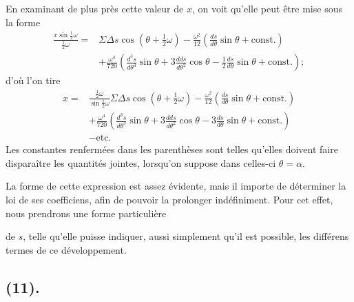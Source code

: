 \documentclass{article}
\begin{document}
En examinant de plus près cette valeur de $x$, on voit qu'elle peut être mise sous la forme
\[ \begin{aligned} \frac{x\sin\frac{1}{2}\omega}{\frac{1}{2}\omega}={}&\Sigma\Delta s\cos(\theta+\tfrac{1}{2}\omega)-\frac{\omega^{2}}{12}\left(\frac{ds}{d\theta}\sin\theta+\text{const.}\right)\\ &+\frac{\omega^{4}}{720}\left(\frac{d^{3}s}{d\theta^{3}}\sin\theta+3\frac{dds}{d\theta^{2}}\cos\theta-\frac{1}{2}\frac{ds}{d\theta}\sin\theta+\text{const.}\right); \end{aligned} \]
d'où l'on tire
\[ \begin{aligned} x={}&\frac{\frac{1}{2}\omega}{\sin\frac{1}{2}\omega}\Sigma\Delta s\cos(\theta+\tfrac{1}{2}\omega)-\frac{\omega^{2}}{12}\left(\frac{ds}{d\theta}\sin\theta+\text{const.}\right)\\ &+\frac{\omega^{4}}{720}\left(\frac{d^{3}s}{d\theta^{3}}\sin\theta+3\frac{dds}{d\theta^{2}}\cos\theta-3\frac{ds}{d\theta}\sin\theta+\text{const.}\right)\\ &-\text{etc.} \end{aligned} \]
Les constantes renfermées dans les parenthèses sont telles qu'elles doivent faire disparaître les quantités jointes, lorsqu'on suppose dans celles-ci $\theta=\alpha$.

La forme de cette expression est assez évidente, mais il importe de déterminer la loi de ses coefficiens, afin de pouvoir la prolonger indéfiniment. Pour cet effet, nous prendrons une forme particulière

de $s$, telle qu'elle puisse indiquer, aussi simplement qu'il est possible, les différens termes de ce développement.

\subsection*{(11).}
\end{document}
